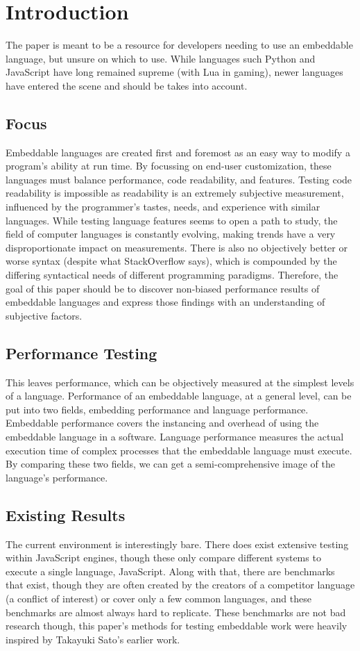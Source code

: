 \section{Introduction} \label{sec:introduction}
The paper is meant to be a resource for developers needing to use an embeddable language, but unsure on which to use. While languages such Python and JavaScript have long remained supreme (with Lua in gaming)\cite{trend:jslua}, newer languages have entered the scene and should be takes into account.

\subsection{Focus}
Embeddable languages are created first and foremost as an easy way to modify a program's ability at run time. By focussing on end-user customization, these languages must balance performance, code readability, and features. Testing code readability is impossible as readability is an extremely subjective measurement, influenced by the programmer's tastes, needs, and experience with similar languages. While testing language features seems to open a path to study, the field of computer languages is constantly evolving, making trends have a very disproportionate impact on measurements. There is also no objectively better or worse syntax (despite what StackOverflow says), which is compounded by the differing syntactical needs of different programming paradigms. Therefore, the goal of this paper should be to discover non-biased performance results of embeddable languages and express those findings with an understanding of subjective factors.

\subsection{Performance Testing}
This leaves performance, which can be objectively measured at the simplest levels of a language. Performance of an embeddable language, at a general level, can be put into two fields, embedding performance and language performance. Embeddable performance covers the instancing and overhead of using the embeddable language in a software. Language performance measures the actual execution time of complex processes that the embeddable language must execute. By comparing these two fields, we can get a semi-comprehensive image of the language's performance.

\subsection{Existing Results}
The current environment is interestingly bare. There does exist extensive testing within JavaScript engines, though these only compare different systems to execute a single language, JavaScript\cite{arewefastyet}. Along with that, there are benchmarks that exist, though they are often created by the creators of a competitor language (a conflict of interest) or cover only a few common languages, and these benchmarks are almost always hard to replicate. These benchmarks are not bad research though, this paper's methods for testing embeddable work were heavily inspired by Takayuki Sato's earlier work\cite{embench}.

